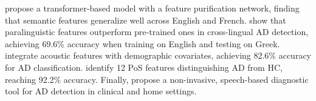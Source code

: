\citet{liu2022improving} propose a transformer-based model with a feature purification network, finding that semantic features generalize well across English and French. \citet{chen2023cross} show that paralinguistic features outperform pre-trained ones in cross-lingual AD detection, achieving 69.6\% accuracy when training on English and testing on Greek. \citet{Tamm2023Cross-Lingual} integrate acoustic features with demographic covariates, achieving 82.6\% accuracy for AD classification. \citet{wen2023revealing} identify 12 PoS features distinguishing AD from HC, reaching 92.2\% accuracy. Finally, \citet{sadeghian2021towards} propose a non-invasive, speech-based diagnostic tool for AD detection in clinical and home settings.